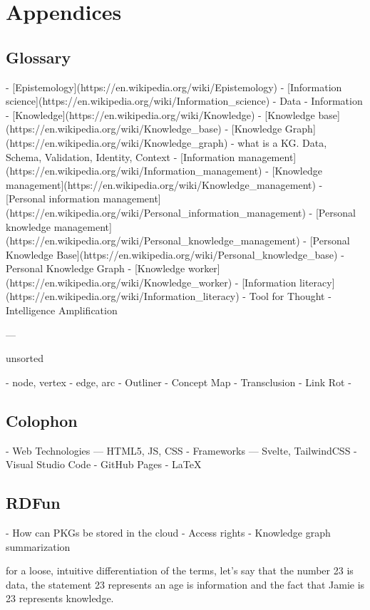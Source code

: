 \chapter{Appendices}

\section{Glossary}
- [Epistemology](https://en.wikipedia.org/wiki/Epistemology)
- [Information science](https://en.wikipedia.org/wiki/Information_science)
- Data
- Information
- [Knowledge](https://en.wikipedia.org/wiki/Knowledge)
- [Knowledge base](https://en.wikipedia.org/wiki/Knowledge_base)
- [Knowledge Graph](https://en.wikipedia.org/wiki/Knowledge_graph)
    - what is a KG. Data, Schema, Validation, Identity, Context
- [Information management](https://en.wikipedia.org/wiki/Information_management)
- [Knowledge management](https://en.wikipedia.org/wiki/Knowledge_management)
- [Personal information management](https://en.wikipedia.org/wiki/Personal_information_management)
- [Personal knowledge management](https://en.wikipedia.org/wiki/Personal_knowledge_management)
- [Personal Knowledge Base](https://en.wikipedia.org/wiki/Personal_knowledge_base)
- Personal Knowledge Graph
- [Knowledge worker](https://en.wikipedia.org/wiki/Knowledge_worker)
- [Information literacy](https://en.wikipedia.org/wiki/Information_literacy)
- Tool for Thought
- Intelligence Amplification

---

unsorted

- node, vertex
- edge, arc
- Outliner
- Concept Map
- Transclusion
- Link Rot
-

\section{Colophon}
- Web Technologies — HTML5, JS, CSS
- Frameworks — Svelte, TailwindCSS
- Visual Studio Code
- GitHub Pages
- \LaTeX

\section{RDFun}

- How can PKGs be stored in the cloud
- Access rights
- Knowledge graph summarization

for a loose, intuitive differentiation of the terms, let’s say that the number 23 is data, the statement 23 represents an age is information and the fact that Jamie is 23 represents knowledge.